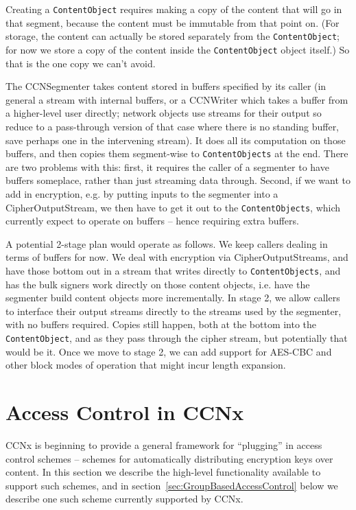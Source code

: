 Creating a {\tt ContentObject} requires making a copy of the content
that will go in that segment, because the content must be immutable
from that point on. (For storage, the content can actually be stored
separately from the {\tt ContentObject}; for now we store a copy of
the content inside the {\tt ContentObject} object itself.) So that is
the one copy we can't avoid.

The CCNSegmenter takes content stored in buffers specified by its
caller (in general a stream with internal buffers, or a CCNWriter
which takes a buffer from a higher-level user directly; network
objects use streams for their output so reduce to a pass-through
version of that case where there is no standing buffer, save perhaps
one in the intervening stream). It does all its computation on those
buffers, and then copies them segment-wise to {\tt ContentObjects} at
the end. There are two problems with this: first, it requires the
caller of a segmenter to have buffers someplace, rather than just
streaming data through. Second, if we want to add in encryption,
e.g. by putting inputs to the segmenter into a CipherOutputStream, we
then have to get it out to the {\tt ContentObjects}, which currently
expect to operate on buffers -- hence requiring extra buffers.

A potential 2-stage plan would operate as follows. We keep callers
dealing in terms of buffers for now. We deal with encryption via
CipherOutputStreams, and have those bottom out in a stream that writes
directly to {\tt ContentObjects}, and has the bulk signers work
directly on those content objects, i.e. have the segmenter build
content objects more incrementally. In stage 2, we allow callers to
interface their output streams directly to the streams used by the
segmenter, with no buffers required. Copies still happen, both at the
bottom into the {\tt ContentObject}, and as they pass through the
cipher stream, but potentially that would be it. Once we move to stage
2, we can add support for AES-CBC and other block modes of operation
that might incur length expansion.

\newpage


\section{Access Control in CCNx}
\label{sec:AccessControl}

CCNx is beginning to provide a general framework for ``plugging'' in
access control schemes -- schemes for automatically distributing
encryption keys over content. In this section we describe the
high-level functionality available to support such schemes, and in
section~\ref{sec:GroupBasedAccessControl} below we describe one such
scheme currently supported by CCNx.

